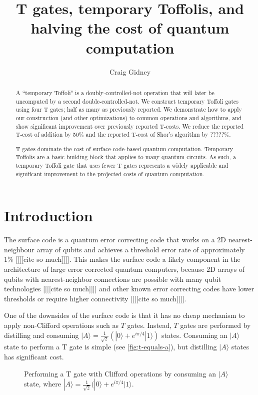 \documentclass[twocolumn,longbibliography]{quantumarticle-customized}
\title{T gates, temporary Toffolis, and halving the cost of quantum computation}
\author{Craig Gidney}
\affiliation{Google, Santa Barbara, CA 93117, USA}
\newcommand{\qS}{\gate{S}}
\begin{document}
\maketitle

\begin{abstract}
A ``temporary Toffoli" is a doubly-controlled-not operation that will later be uncomputed by a second double-controlled-not.
We construct temporary Toffoli gates using four T gates; half as many as previously reported.
We demonstrate how to apply our construction (and other optimizations) to common operations and algorithms, and show significant improvement over previously reported T-costs.
We reduce the reported T-cost of addition by 50\% and the reported T-cost of Shor's algorithm by ?????\%.

T gates dominate the cost of surface-code-based quantum computation.
Temporary Toffolis are a basic building block that applies to many quantum circuits.
As such, a temporary Toffoli gate that uses fewer T gates represents a widely applicable and significant improvement to the projected costs of quantum computation.
\end{abstract}


\section{Introduction}
\label{sec:introduction}

The surface code is a quantum error correcting code that works on a 2D nearest-neighbour array of qubits and achieves a threshold error rate of approximately 1\% [[[[cite so much]]]].
This makes the surface code a likely component in the architecture of large error corrected quantum computers, because 2D arrays of qubits with nearest-neighbor connections are possible with many qubit technologies [[[[cite so much]]]] and other known error correcting codes have lower thresholds or require higher connectivity [[[[cite so much]]]].

One of the downsides of the surface code is that it has no cheap mechanism to apply non-Clifford operations such as $T$ gates.
Instead, $T$ gates are performed by distilling and consuming $|A\rangle = \frac{1}{\sqrt{2}} (|0\rangle + e^{i \pi/4} |1\rangle)$ states.
Consuming an $|A\rangle$ state to perform a T gate is simple (see \autoref{fig:t-equals-a}), but distilling $|A\rangle$ states has significant cost.

\begin{figure}
  \resizebox{\linewidth}{!}{
    \Qcircuit @R=0.7em @C=0.7em {
      &\gate{T}&\qw &&=&&&          &&\qw &\ctrl{1}&\qw    &\qS            &\qw &\\
      &        &    && &&&|A\rangle &&\qw &\targ   &\meter &\cw\cwx\bullet &    &\\
    }
  }
  \caption{
	Performing a T gate with Clifford operations by consuming an $|A\rangle$ state, where $|A\rangle = \frac{1}{\sqrt{2}} (|0\rangle + e^{i \pi/4} |1\rangle$.
  }
  \label{fig:t-equals-a}
\end{figure}
\end{document}
